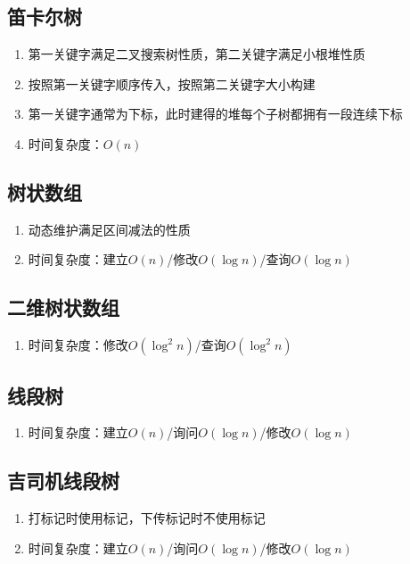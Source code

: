 \documentclass[twocolumn,a4,8pt]{article}  %
\begin{document}
	 	\subsection{笛卡尔树}
			\noindent\begin{enumerate}
				\item 第一关键字满足二叉搜索树性质，第二关键字满足小根堆性质
				\item 按照第一关键字顺序传入，按照第二关键字大小构建
				\item 第一关键字通常为下标，此时建得的堆每个子树都拥有一段连续下标
				\item 时间复杂度：$O(n)$
			\end{enumerate}
	 	 	

	 	\subsection{树状数组}
			\noindent\begin{enumerate}
				\item 动态维护满足区间减法的性质
				\item 时间复杂度：建立$O(n)$/修改$O(\log n)$/查询$O(\log n)$
			\end{enumerate}
	 	 	
	 	 	
	 	\subsection{二维树状数组}
			\noindent\begin{enumerate}
				\item 时间复杂度：修改$O(\log^2n)$/查询$O(\log^2n)$
			\end{enumerate}
	 	 	
	 	 	
	 	\subsection{线段树}
			\noindent\begin{enumerate}
				\item 时间复杂度：建立$O(n)$/询问$O(\log n)$/修改$O(\log n)$
			\end{enumerate}
	 	 	
	 	 	
	 	\subsection{吉司机线段树}
			\noindent\begin{enumerate}
				\item 打标记时使用标记，下传标记时不使用标记
				\item 时间复杂度：建立$O(n)$/询问$O(\log n)$/修改$O(\log n)$
			\end{enumerate}
	 	 	
	 	 	
\end{document}
